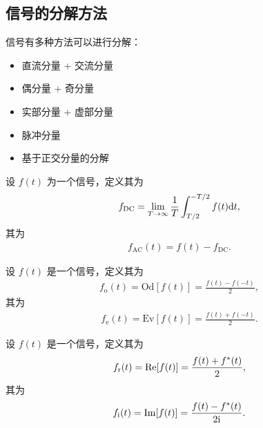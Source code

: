 \subsection{信号的分解方法}

信号有多种方法可以进行分解：
\begin{itemize}
    \item 直流分量 + 交流分量
    \item 偶分量 + 奇分量
    \item 实部分量 + 虚部分量
    \item 脉冲分量
    \item 基于正交分量的分解
\end{itemize}

\begin{definition}
    设 $f(t)$ 为一个信号，定义其为
    \begin{align*}
        f_{\text{DC}} = \lim_{T \to \infty}\frac{1}{T}\int_{T/2}^{-T/2}f(t)\mathrm{d}{t},
    \end{align*}
    其为
    \begin{align*}
        f_{\text{AC}}(t) = f(t) - f_{\text{DC}}.
    \end{align*}
\end{definition}

\begin{definition}
    设 $f(t)$ 是一个信号，定义其为
    \begin{align*}
        f_{\text{o}}(t) = \text{Od}[f(t)] = \frac{f(t) - f(-t)}{2},
    \end{align*}
    其为
    \begin{align*}
        f_{\text{e}}(t) = \text{Ev}[f(t)] = \frac{f(t) + f(-t)}{2}.
    \end{align*}
\end{definition}

\begin{definition}
    设 $f(t)$ 是一个信号，定义其为
    \begin{align*}
        f_{\text{r}}(t) = \mathrm{Re}[f(t)] = \frac{f(t) + f^*(t)}{2},
    \end{align*}
    其为
    \begin{align*}
        f_{\text{i}}(t) = \mathrm{Im}[f(t)] = \frac{f(t) - f^*(t)}{2\mathrm{i}}.
    \end{align*}
\end{definition}

